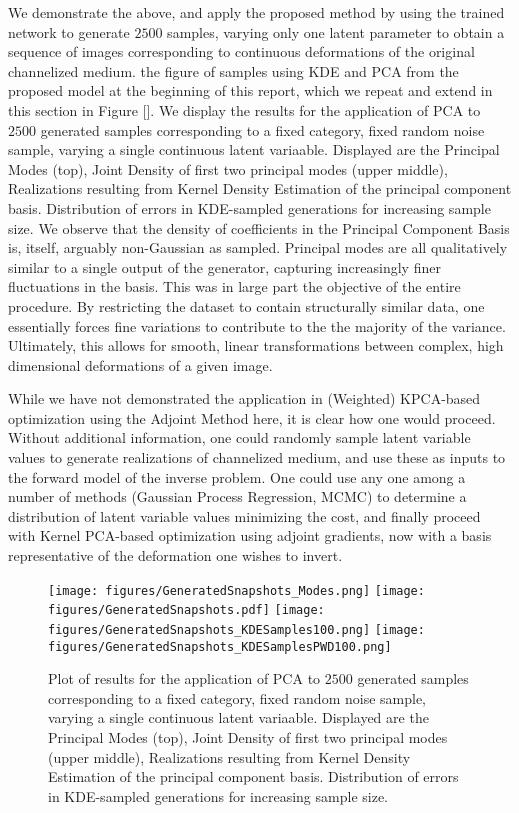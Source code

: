 \documentclass{article}
\begin{document}
	We demonstrate the above, and apply the proposed method by using the trained network to generate $2500$ samples, varying only one latent parameter to obtain a sequence of images corresponding to continuous deformations of the original channelized medium.   the figure of samples using KDE and PCA from the proposed model at the beginning of this report, which we repeat and extend in this section in Figure [\label{GenPCA2}].  We display the results for the application of PCA to $2500$ generated samples corresponding to a fixed category, fixed random noise sample, varying a single continuous latent variaable. Displayed are the Principal Modes (top), Joint Density of first two principal modes (upper middle), Realizations resulting from Kernel Density Estimation of the principal component basis.  Distribution of errors in KDE-sampled generations for increasing sample size.  We observe that the density of coefficients in the Principal Component Basis is, itself, arguably non-Gaussian as sampled.  Principal modes are all qualitatively similar to a single output of the generator, capturing increasingly finer fluctuations in the basis. This was in large part the objective of the entire procedure.  By restricting the dataset to contain structurally similar data, one essentially forces fine variations to contribute to the the majority of the variance.  Ultimately, this allows for smooth, linear transformations between complex, high dimensional deformations of a given image.
    
    While we have not demonstrated the application in (Weighted) KPCA-based optimization using the Adjoint Method here, it is clear how one would proceed.  Without additional information, one could randomly sample latent variable values to generate realizations of channelized medium, and use these as inputs to the forward model of the inverse problem. One could use any one among a number of methods (Gaussian Process Regression, MCMC) to determine a distribution of latent variable values minimizing the cost, and finally proceed with Kernel PCA-based optimization using adjoint gradients, now with a basis representative of the deformation one wishes to invert.
  
\begin{figure}[h]
\centering
  \texttt{[image: figures/GeneratedSnapshots\_Modes.png]}
  \texttt{[image: figures/GeneratedSnapshots.pdf]}
  \texttt{[image: figures/GeneratedSnapshots\_KDESamples100.png]}
  \texttt{[image: figures/GeneratedSnapshots\_KDESamplesPWD100.png]}
  \caption{Plot of results for the application of PCA to $2500$ generated samples corresponding to a fixed category, fixed random noise sample, varying a single continuous latent variaable. Displayed are the Principal Modes (top), Joint Density of first two principal modes (upper middle), Realizations resulting from Kernel Density Estimation of the principal component basis.  Distribution of errors in KDE-sampled generations for increasing sample size.}
\end{figure}\label{GenPCA2}
\end{document}
